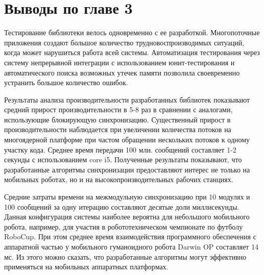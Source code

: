 \section*{Выводы по главе 3}

Тестирование библиотеки велось одновременно с ее разработкой. 
Многопоточные приложения создают большое количество 
трудновоспроизводимых ситуаций, когда может нарушиться работа 
всей системы. Автоматизация тестирования через систему 
непрерывной интеграции с использованием юнит-тестирования и 
автоматического поиска возможных утечек памяти позволила 
своевременно устранить большое количество ошибок.

Результаты анализа производительности разработанных библиотек 
показывают средний прирост производительности в 5-8 раз в 
сравнении с аналогами, использующие блокирующую синхронизацию. 
Существенный прирост в производительности наблюдается при 
увеличении количества потоков на многоядерной платформе при 
частом обращении нескольких потоков к одному участку кода. 
Среднее время передачи 100 млн. сообщений составляет 1-2 секунды 
с использованием core i5. Полученные результаты показывают, что 
разработанные алгоритмы синхронизации предоставляют интерес не 
только на мобильных роботах, но и на высокопроизводительных 
рабочих станциях.

Средние затраты времени на межмодульную синхронизацию при 10 
модулях и 100 сообщений за одну итерацию составляют десятые доли 
миллисекунды. Данная конфигурация системы наиболее вероятна для 
небольшого мобильного робота, например, для участия в 
робототехническом чемпионате по футболу RoboCup. При этом 
среднее время взаимодействия программного обеспечения с 
аппаратной частью у мобильного гуманоидного робота Darwin OP 
составляет 14 мс.  Из этого можно сказать, что разработанные 
алгоритмы могут эффективно применяться на мобильных аппаратных 
платформах.